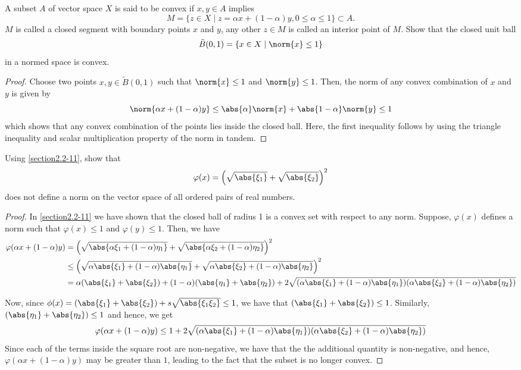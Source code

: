 \begin{question}
    A subset $A$ of vector space $X$ is said to be convex if $x , y \in A$ implies
    \[M = \{z \in X \mid z = \alpha x + (1-\alpha)y , 0 \leq \alpha \leq 1\} \subset A.\]
    $M$ is called a closed segment with boundary points $x$ and $y$, any other $z \in M$ is called an interior point of $M$. Show that the closed unit ball
    \[\tilde{B}(0,1) = \{x \in X \mid \norm{x} \leq 1\}\]
    in a normed space is convex.
    \label{section2.2-11}
\end{question}
\begin{proof}
    Choose two points $x , y \in \tilde{B}(0,1)$ such that $\norm{x} \leq 1$ and $\norm{y} \leq 1$. Then, the norm of any convex combination of $x$ and $y$ is given by
    \[\norm{\alpha x + (1-\alpha)y} \leq \abs{\alpha} \norm{x} + \abs{1-\alpha} \norm{y} \leq 1\]
    which shows that any convex combination of the points lies inside the closed ball. Here, the first inequality follows by using the triangle inequality and scalar multiplication property of the norm in tandem.
\end{proof}

\begin{question}
    Using \ref{section2.2-11}, show that
    \[\varphi(x) = \left( \sqrt{\abs{\xi_1}} + \sqrt{\abs{\xi_2}} \right)^2\]
    does not define a norm on the vector space of all ordered pairs of real numbers.
    \label{section2.2-12}
\end{question}
\begin{proof}
    In \ref{section2.2-11} we have shown that the closed ball of radius 1 is a convex set with respect to any norm. Suppose, $\varphi(x)$ defines a norm such that $\varphi(x) \leq 1$ and $\varphi(y) \leq 1$. Then, we have
    \begin{align*}
        \varphi(\alpha x + (1-\alpha)y) &= \left( \sqrt{\abs{\alpha \xi_1 + (1-\alpha) \eta_1}} + \sqrt{ \abs{\alpha \xi_2 + (1-\alpha) \eta_2} } \right)^2
        \\
        &\leq \left( \sqrt{\alpha \abs{\xi_1} + (1-\alpha) \abs{\eta_1}} + \sqrt{\alpha \abs{\xi_2} + (1-\alpha) \abs{\eta_2}} \right)^2
        \\
        &= \alpha (\abs{\xi_1} + \abs{\xi_2}) + (1-\alpha) (\abs{\eta_1} + \abs{\eta_2}) + 2\sqrt{(\alpha \abs{\xi_1} + (1-\alpha) \abs{\eta_1})(\alpha \abs{\xi_2} + (1-\alpha) \abs{\eta_2})}
    \end{align*}

    Now, since $\phi(x) = (\abs{\xi_1} + \abs{\xi_2}) + s \sqrt{\abs{\xi_1\xi_2}} \leq 1$, we have that $(\abs{\xi_1} + \abs{\xi_2}) \leq 1$. Similarly, $(\abs{\eta_1} + \abs{\eta_2}) \leq 1$ and hence, we get
    \[\varphi(\alpha x + (1-\alpha)y) \leq 1 + 2\sqrt{(\alpha \abs{\xi_1} + (1-\alpha) \abs{\eta_1})(\alpha \abs{\xi_2} + (1-\alpha) \abs{\eta_2})}\]
    Since each of the terms inside the square root are non-negative, we have that the the additional quantity is non-negative, and hence, $\varphi(\alpha x + (1-\alpha)y)$ may be greater than $1$, leading to the fact that the subset is no longer convex.
\end{proof}

